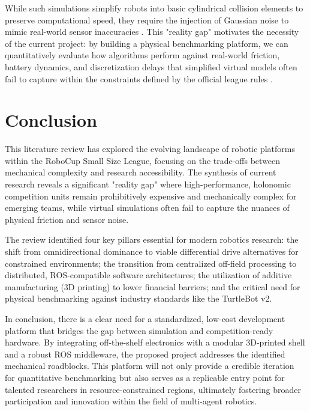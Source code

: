 \documentclass[a4paper,twoside,12pt]{report}
\begin{document}
While such simulations simplify robots into basic cylindrical collision elements to preserve computational speed, they require the injection of Gaussian noise to mimic real-world sensor inaccuracies \cite{yao2015simulation}. This "reality gap" motivates the necessity of the current project: by building a physical benchmarking platform, we can quantitatively evaluate how algorithms perform against real-world friction, battery dynamics, and discretization delays that simplified virtual models often fail to capture within the constraints defined by the official league rules \cite{ssl_rules_2026}.

\chapter{Conclusion}\label{chapter: conclusion}
This literature review has explored the evolving landscape of robotic platforms within the RoboCup Small Size League, focusing on the trade-offs between mechanical complexity and research accessibility. The synthesis of current research reveals a significant "reality gap" where high-performance, holonomic competition units remain prohibitively expensive and mechanically complex for emerging teams, while virtual simulations often fail to capture the nuances of physical friction and sensor noise.

The review identified four key pillars essential for modern robotics research: the shift from omnidirectional dominance to viable differential drive alternatives for constrained environments; the transition from centralized off-field processing to distributed, ROS-compatible software architectures; the utilization of additive manufacturing (3D printing) to lower financial barriers; and the critical need for physical benchmarking against industry standards like the TurtleBot v2.

In conclusion, there is a clear need for a standardized, low-cost development platform that bridges the gap between simulation and competition-ready hardware. By integrating off-the-shelf electronics with a modular 3D-printed shell and a robust ROS middleware, the proposed project addresses the identified mechanical roadblocks. This platform will not only provide a credible iteration for quantitative benchmarking but also serves as a replicable entry point for talented researchers in resource-constrained regions, ultimately fostering broader participation and innovation within the field of multi-agent robotics.


\end{document}
